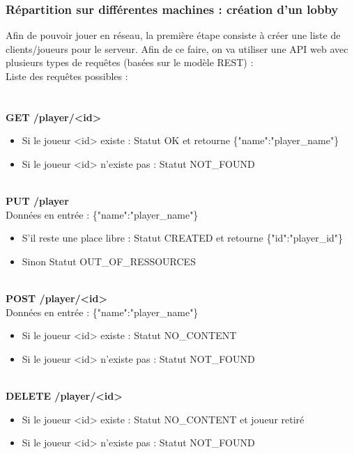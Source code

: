 \documentclass[a4paper,12pt]{article}
\begin{document}
\subsubsection{Répartition sur différentes machines : création d'un lobby}

Afin de pouvoir jouer en réseau, la première étape consiste à créer une liste de clients/joueurs pour le serveur. Afin de ce faire, on va utiliser une API web avec plusieurs types de requêtes (basées sur le modèle REST) :\\ %
Liste des requêtes possibles :\\\\
\textbf{\\GET /player/<id>}\\
\begin{itemize}
\item Si le joueur <id> existe : Statut OK et retourne \{"name":"player\_name"\}
\item Si le joueur <id> n'existe pas : Statut NOT\_FOUND
\end{itemize}

\textbf{\\PUT /player}\\
Données en entrée :  \{"name":"player\_name"\}\\
\begin{itemize}
\item S'il reste une place libre : Statut CREATED et retourne \{"id":"player\_id"\}
\item Sinon Statut OUT\_OF\_RESSOURCES
\end{itemize}

\textbf{\\POST /player/<id>}\\
Données en entrée :  \{"name":"player\_name"\}\\
\begin{itemize}
\item Si le joueur <id> existe : Statut NO\_CONTENT
\item Si le joueur <id> n'existe pas : Statut NOT\_FOUND
\end{itemize}

\textbf{\\DELETE /player/<id>}\\
\begin{itemize}
\item Si le joueur <id> existe : Statut NO\_CONTENT et joueur retiré
\item Si le joueur <id> n'existe pas : Statut NOT\_FOUND
\end{itemize}
\end{document}
